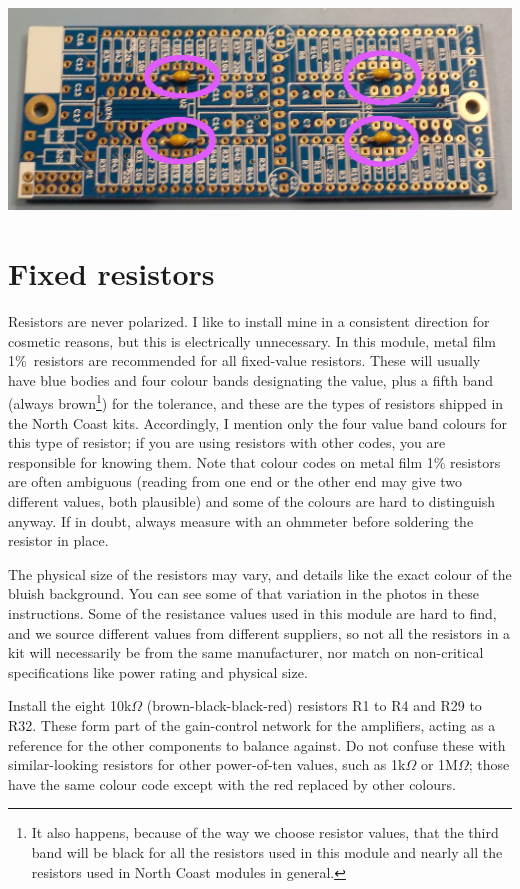 \noindent\includegraphics[width=\linewidth]{cap-decoup.jpg}

\section{Fixed resistors}

Resistors are never polarized.  I like to install mine in a consistent
direction for cosmetic reasons, but this is electrically unnecessary.  In
this module, metal film 1\%\ resistors are recommended for all fixed-value
resistors.  These will usually have blue bodies and four colour bands
designating the value, plus a fifth band (always brown\footnote{It also
happens, because of the way we choose resistor values, that the third band
will be black for all the resistors used in this module and nearly all the
resistors used in North Coast modules in general.}) for the tolerance,
and these are the types of resistors shipped in the North Coast kits.
Accordingly, I mention only the four value band colours for this type of
resistor; if you are using resistors with other codes, you are responsible
for knowing them.  Note that colour codes on metal film 1\% resistors are
often ambiguous (reading from one end or the other end may give two
different values, both plausible) and some of the colours are hard to
distinguish anyway.  If in doubt, always measure with an ohmmeter before
soldering the resistor in place.

The physical size of the resistors may vary, and details like the exact
colour of the bluish background.  You can see some of that variation in the
photos in these instructions.  Some of the resistance values used in this
module are hard to find, and we source different values from different
suppliers, so not all the resistors in a kit will necessarily be from the
same manufacturer, nor match on non-critical specifications like power
rating and physical size.

Install the eight 10k$\Omega$ (brown-black-black-red) resistors R1 to R4 and
R29 to R32.  These form part of the gain-control network for the amplifiers,
acting as a reference for the other components to balance against.  Do
not confuse these with similar-looking resistors for other power-of-ten
values, such as 1k$\Omega$ or 1M$\Omega$; those have the same colour code
except with the red replaced by other colours.


